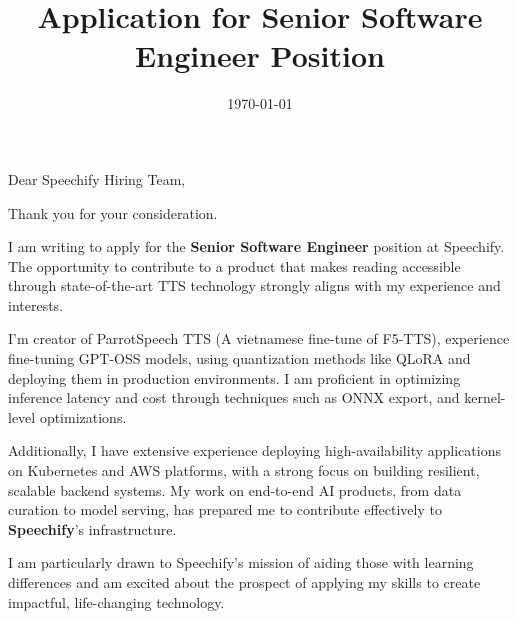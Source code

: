 \documentclass[11pt,a4paper,roman]{moderncv}
\title{Application for Senior Software Engineer Position}
\begin{document}
	
	\date{\today}
	\opening{Dear Speechify Hiring Team,}
	\closing{Thank you for your consideration.}
	\makelettertitle
	
	I am writing to apply for the \textbf{Senior Software Engineer} position at Speechify. The opportunity to contribute to a product that makes reading accessible through state-of-the-art TTS technology strongly aligns with my experience and interests.
	
	I'm creator of ParrotSpeech TTS (A vietnamese fine-tune of F5-TTS), experience fine-tuning GPT-OSS models, using quantization methods like QLoRA and deploying them in production environments. I am proficient in optimizing inference latency and cost through techniques such as ONNX export, and kernel-level optimizations.
	
	Additionally, I have extensive experience deploying high-availability applications on Kubernetes and AWS platforms, with a strong focus on building resilient, scalable backend systems. My work on end-to-end AI products, from data curation to model serving, has prepared me to contribute effectively to \textbf{Speechify}'s infrastructure.
	
	I am particularly drawn to Speechify's mission of aiding those with learning differences and am excited about the prospect of applying my skills to create impactful, life-changing technology.
	
	\makeletterclosing
	
\end{document}
